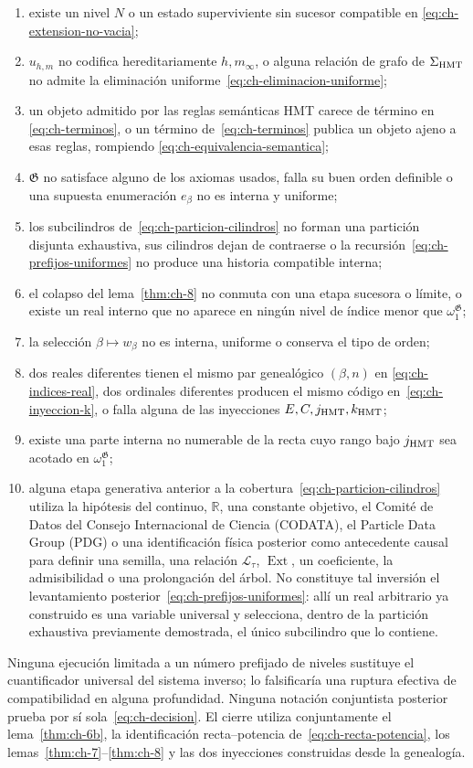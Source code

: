 \begin{enumerate}
\item existe un nivel \(N\) o un estado superviviente sin sucesor compatible en
\eqref{eq:ch-extension-no-vacia};
\item \(u_{h,m}\) no codifica hereditariamente \(h,m_\infty\), o alguna relación
de grafo de \(\Sigma_{\rm HMT}\) no admite la eliminación uniforme~\eqref{eq:ch-eliminacion-uniforme};
\item un objeto admitido por las reglas semánticas HMT carece de término en
\eqref{eq:ch-terminos}, o un término de~\eqref{eq:ch-terminos} publica un objeto ajeno a esas reglas, rompiendo
\eqref{eq:ch-equivalencia-semantica};
\item \(\mathfrak G\) no satisface alguno de los axiomas usados, falla su buen
orden definible o una supuesta enumeración \(e_\beta\) no es interna y
uniforme;
\item los subcilindros de~\eqref{eq:ch-particion-cilindros} no forman una partición disjunta exhaustiva, sus
cilindros dejan de contraerse o la recursión~\eqref{eq:ch-prefijos-uniformes} no produce una
historia compatible interna;
\item el colapso del lema~\ref{thm:ch-8} no conmuta con una etapa sucesora o límite, o existe
un real interno que no aparece en ningún nivel de índice menor que
\(\omega_1^{\mathfrak G}\);
\item la selección \(\beta\mapsto w_\beta\) no es interna, uniforme o conserva
el tipo de orden;
\item dos reales diferentes tienen el mismo par genealógico \((\beta,n)\) en
\eqref{eq:ch-indices-real}, dos ordinales diferentes producen el mismo código en~\eqref{eq:ch-inyeccion-k}, o falla
alguna de las inyecciones \(E,C,j_{\rm HMT},k_{\rm HMT}\);
\item existe una parte interna no numerable de la recta cuyo rango bajo
\(j_{\rm HMT}\) sea acotado en \(\omega_1^{\mathfrak G}\);
\item alguna etapa generativa anterior a la cobertura~\eqref{eq:ch-particion-cilindros} utiliza la hipótesis del continuo,
\(\mathbb R\), una constante objetivo, el Comité de Datos del Consejo
Internacional de Ciencia (CODATA), el Particle Data Group (PDG) o una identificación física
posterior como antecedente causal para definir una semilla, una relación
\(\mathscr L_\tau\), \(\operatorname{Ext}\), un coeficiente, la admisibilidad
o una prolongación del árbol. No constituye tal inversión el levantamiento
posterior~\eqref{eq:ch-prefijos-uniformes}: allí un real arbitrario ya construido es una variable
universal y selecciona, dentro de la partición exhaustiva previamente
demostrada, el único subcilindro que lo contiene.
\end{enumerate}

Ninguna ejecución limitada a un número prefijado de niveles sustituye el
cuantificador universal del sistema inverso; lo falsificaría una ruptura
efectiva de compatibilidad en alguna profundidad. Ninguna notación conjuntista
posterior prueba por sí sola~\eqref{eq:ch-decision}. El cierre utiliza conjuntamente el
lema~\ref{thm:ch-6b}, la identificación recta--potencia de~\eqref{eq:ch-recta-potencia}, los
lemas~\ref{thm:ch-7}--\ref{thm:ch-8} y las dos inyecciones construidas desde
la genealogía.
